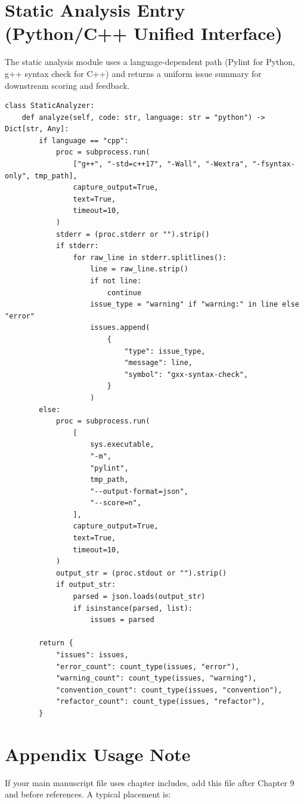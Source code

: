 \section{Static Analysis Entry (Python/C++ Unified Interface)}
The static analysis module uses a language-dependent path (Pylint for Python, g++ syntax check for C++) and returns a uniform issue summary for downstream scoring and feedback.

\begin{verbatim}
class StaticAnalyzer:
    def analyze(self, code: str, language: str = "python") -> Dict[str, Any]:
        if language == "cpp":
            proc = subprocess.run(
                ["g++", "-std=c++17", "-Wall", "-Wextra", "-fsyntax-only", tmp_path],
                capture_output=True,
                text=True,
                timeout=10,
            )
            stderr = (proc.stderr or "").strip()
            if stderr:
                for raw_line in stderr.splitlines():
                    line = raw_line.strip()
                    if not line:
                        continue
                    issue_type = "warning" if "warning:" in line else "error"
                    issues.append(
                        {
                            "type": issue_type,
                            "message": line,
                            "symbol": "gxx-syntax-check",
                        }
                    )
        else:
            proc = subprocess.run(
                [
                    sys.executable,
                    "-m",
                    "pylint",
                    tmp_path,
                    "--output-format=json",
                    "--score=n",
                ],
                capture_output=True,
                text=True,
                timeout=10,
            )
            output_str = (proc.stdout or "").strip()
            if output_str:
                parsed = json.loads(output_str)
                if isinstance(parsed, list):
                    issues = parsed

        return {
            "issues": issues,
            "error_count": count_type(issues, "error"),
            "warning_count": count_type(issues, "warning"),
            "convention_count": count_type(issues, "convention"),
            "refactor_count": count_type(issues, "refactor"),
        }
\end{verbatim}

\section{Appendix Usage Note}
If your main manuscript file uses chapter includes, add this file after Chapter 9 and before references. A typical placement is:

\begin{verbatim}



\end{verbatim}
